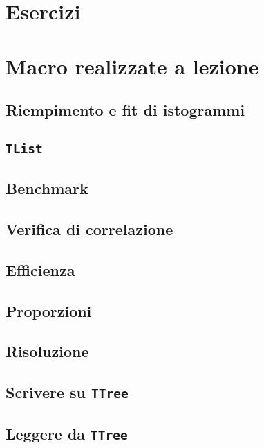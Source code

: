 \documentclass{article}
\begin{document}
\section{Esercizi}









\section{Macro realizzate a lezione}

\subsection{Riempimento e fit di istogrammi}


\subsection{\texttt{TList}}


\subsection{Benchmark}


\subsection{Verifica di correlazione}


\subsection{Efficienza}


\subsection{Proporzioni}


\subsection{Risoluzione}


\subsection{Scrivere su \texttt{TTree}}


\subsection{Leggere da \texttt{TTree}}

\end{document}
